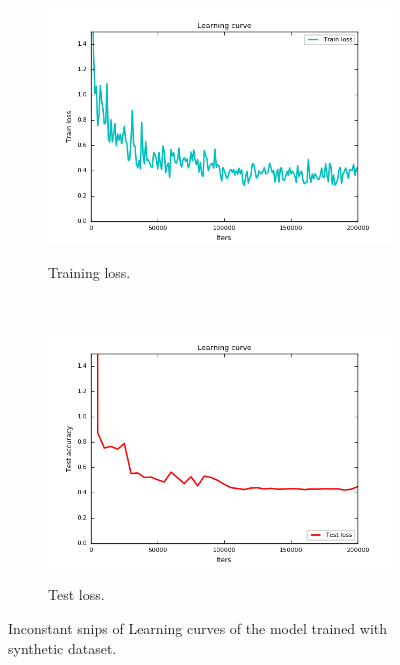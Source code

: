 \begin{figure}[h!]
    \centering
    \begin{subfigure}[H]{0.5\textwidth}
        \centering
        {\includegraphics[width=1\textwidth]{images/train_U}}
        \caption{Training loss. }
    \end{subfigure}%
    ~ 
    \begin{subfigure}[H]{0.5\textwidth}
        \centering
        {\includegraphics[width=1\textwidth]{images/test_U}}
        \caption{Test loss.}
    \end{subfigure}
    \caption{Inconstant snips of Learning curves of the model trained with synthetic dataset. }
    \label{fig:ucurve}
\end{figure}





